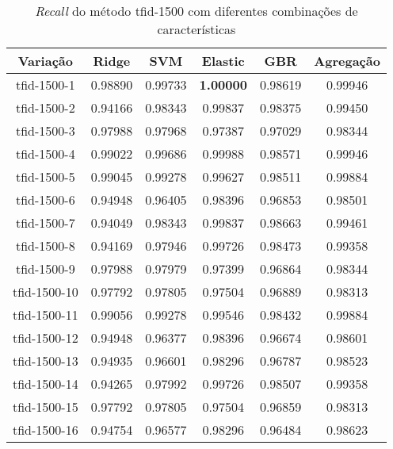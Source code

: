 \begin{table}[H]
\centering
\begin{tabular}{|c| c c  c  c  c| }
\hline
Variação &  Ridge & SVM & Elastic & GBR & Agregação  \\ 
\hline
tfid-1500-1 & 0.98890 & 0.99733 & \textbf{1.00000} & 0.98619 & 0.99946 \\
\hline
tfid-1500-2 & 0.94166 & 0.98343 & 0.99837 & 0.98375 & 0.99450 \\
\hline
tfid-1500-3 & 0.97988 & 0.97968 & 0.97387 & 0.97029 & 0.98344 \\
\hline
tfid-1500-4 & 0.99022 & 0.99686 & 0.99988 & 0.98571 & 0.99946 \\
\hline
tfid-1500-5 & 0.99045 & 0.99278 & 0.99627 & 0.98511 & 0.99884 \\
\hline
tfid-1500-6 & 0.94948 & 0.96405 & 0.98396 & 0.96853 & 0.98501 \\
\hline
tfid-1500-7 & 0.94049 & 0.98343 & 0.99837 & 0.98663 & 0.99461 \\
\hline
tfid-1500-8 & 0.94169 & 0.97946 & 0.99726 & 0.98473 & 0.99358 \\
\hline
tfid-1500-9 & 0.97988 & 0.97979 & 0.97399 & 0.96864 & 0.98344 \\
\hline
tfid-1500-10 & 0.97792 & 0.97805 & 0.97504 & 0.96889 & 0.98313 \\
\hline
tfid-1500-11 & 0.99056 & 0.99278 & 0.99546 & 0.98432 & 0.99884 \\
\hline
tfid-1500-12 & 0.94948 & 0.96377 & 0.98396 & 0.96674 & 0.98601 \\
\hline
tfid-1500-13 & 0.94935 & 0.96601 & 0.98296 & 0.96787 & 0.98523 \\
\hline
tfid-1500-14 & 0.94265 & 0.97992 & 0.99726 & 0.98507 & 0.99358 \\
\hline
tfid-1500-15 & 0.97792 & 0.97805 & 0.97504 & 0.96859 & 0.98313 \\
\hline
tfid-1500-16 & 0.94754 & 0.96577 & 0.98296 & 0.96484 & 0.98623 \\
\hline
\end{tabular}
\caption{\textit{Recall} do método tfid-1500 com diferentes combinações de características}
\label{tab:recalltfid1500}
\end{table}

